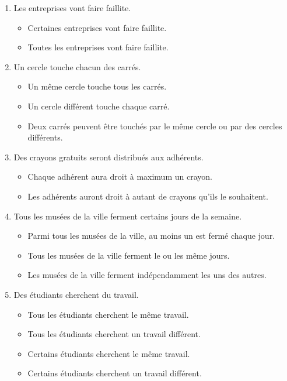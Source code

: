 \documentclass[11pt,letterpaper]{article}
\begin{document}
\begin{enumerate}
\vspace{7px}

\item Les entreprises vont faire faillite.
\begin{itemize}
    \item Certaines entreprises vont faire faillite.
    \item Toutes les entreprises vont faire faillite.
\end{itemize}

\vspace{7px}

\item Un cercle touche chacun des carrés.
\begin{itemize}
    \item Un même cercle touche tous les carrés.
    \item Un cercle différent touche chaque carré.
    \item Deux carrés peuvent être touchés par le même cercle ou par des cercles différents.
\end{itemize}

\vspace{7px}

\item Des crayons gratuits seront distribués aux adhérents.
\begin{itemize}
    \item Chaque adhérent aura droit à maximum un crayon.
    \item Les adhérents auront droit à autant de crayons qu'ils le souhaitent.
\end{itemize}

\vspace{7px}

\item Tous les musées de la ville ferment certains jours de la semaine.
\begin{itemize}
    \item Parmi tous les musées de la ville, au moins un est fermé chaque jour.
    \item Tous les musées de la ville ferment le ou les même jours.
    \item Les musées de la ville ferment indépendamment les uns des autres.
\end{itemize}

\vspace{7px}

\item Des étudiants cherchent du travail.
\begin{itemize}
    \item Tous les étudiants cherchent le même travail.
    \item Tous les étudiants cherchent un travail différent.
    \item Certains étudiants cherchent le même travail.
    \item Certains étudiants cherchent un travail différent.
\end{itemize}


\end{enumerate}
\end{document}
